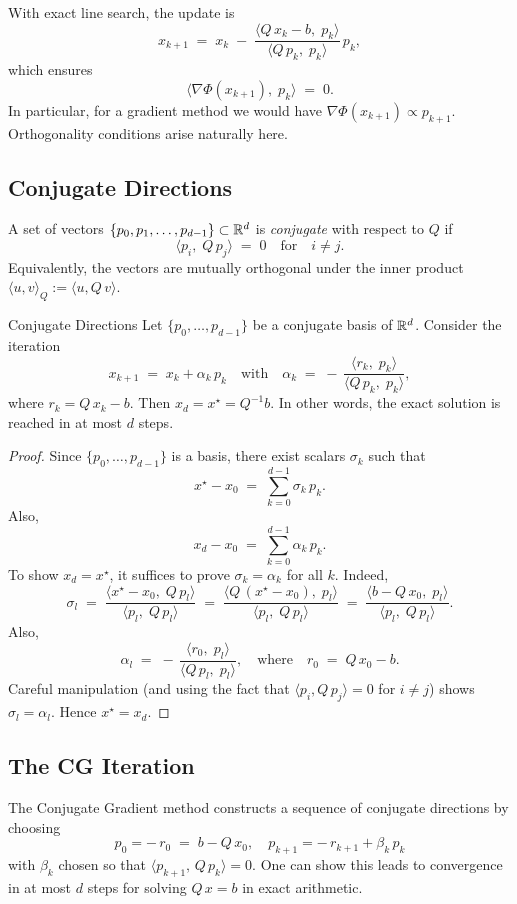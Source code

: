 With exact line search, the update is
\[
  x_{k+1}
  \;=\; x_k \;-\; \frac{\langle Q\,x_k - b,\;p_k\rangle}{\langle Q\,p_k,\;p_k\rangle}\,p_k,
\]
which ensures
\[
  \langle \nabla \Phi(x_{k+1}),\;p_k\rangle \;=\; 0.
\]
In particular, for a gradient method we would have \(\nabla \Phi(x_{k+1}) \propto p_{k+1}\). Orthogonality conditions arise naturally here.

\subsection*{Conjugate Directions}
A set of vectors \(\{p_0, p_1, \dots, p_{d-1}\}\subset \mathbb{R}^d\) is \emph{conjugate} with respect to \(Q\) if
\[
  \langle p_i,\;Q\,p_j\rangle \;=\; 0 \quad\text{for}\quad i\neq j.
\]
Equivalently, the vectors are mutually orthogonal under the inner product \(\langle u, v \rangle_Q := \langle u, Q\,v\rangle\).

\begin{lemma}{Conjugate Directions}{}
  Let \(\{p_0,\ldots,p_{d-1}\}\) be a conjugate basis of \(\mathbb{R}^d\). Consider the iteration
  \[
    x_{k+1} \;=\; x_k + \alpha_k\,p_k
    \quad\text{with}\quad
    \alpha_k \;=\; -\,\frac{\langle r_k,\;p_k\rangle}{\langle Q\,p_k,\;p_k\rangle},
  \]
  where \(r_k = Q\,x_k - b\). Then \(x_d = x^\star = Q^{-1}b\). In other words, the exact solution is reached in at most \(d\) steps.
\end{lemma}

\begin{proof}{}{}
  Since \(\{p_0,\ldots,p_{d-1}\}\) is a basis, there exist scalars \(\sigma_k\) such that
  \[
    x^\star - x_0
    \;=\; \sum_{k=0}^{d-1} \sigma_k\,p_k.
  \]
  Also,
  \[
    x_d - x_0
    \;=\; \sum_{k=0}^{d-1} \alpha_k\,p_k.
  \]
  To show \(x_d = x^\star\), it suffices to prove \(\sigma_k = \alpha_k\) for all \(k\). Indeed,
  \[
    \sigma_l
    \;=\; \frac{\langle x^\star - x_0,\;Q\,p_l\rangle}{\langle p_l,\;Q\,p_l\rangle}
    \;=\; \frac{\langle Q\,(x^\star - x_0),\;p_l\rangle}{\langle p_l,\;Q\,p_l\rangle}
    \;=\; \frac{\langle b - Q\,x_0,\;p_l\rangle}{\langle p_l,\;Q\,p_l\rangle}.
  \]
  Also,
  \[
    \alpha_l
    \;=\; -\,\frac{\langle r_0,\;p_l\rangle}{\langle Q\,p_l,\;p_l\rangle},
    \quad\text{where}\quad r_0 \;=\; Q\,x_0 - b.
  \]
  Careful manipulation (and using the fact that \(\langle p_i, Q\,p_j\rangle=0\) for \(i\neq j\)) shows \(\sigma_l = \alpha_l\). Hence \(x^\star = x_d\).
\end{proof}

\subsection*{The CG Iteration}
The Conjugate Gradient method constructs a sequence of conjugate directions by choosing
\[
  p_0 = -\,r_0 \;=\; b - Q\,x_0,
  \quad
  p_{k+1} = -\,r_{k+1} + \beta_k\,p_k
\]
with \(\beta_k\) chosen so that \(\langle p_{k+1},\,Q\,p_k\rangle=0\). One can show this leads to convergence in at most \(d\) steps for solving \(Q\,x = b\) in exact arithmetic.

